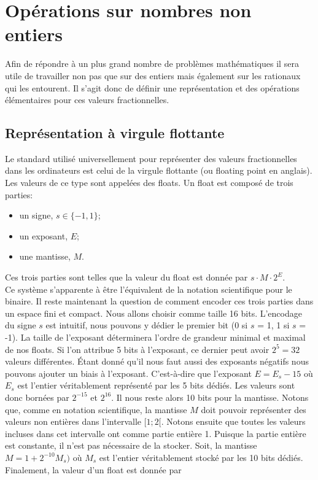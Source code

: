 \documentclass{article}
\begin{document}
\section{Opérations sur nombres non entiers}
Afin de répondre à un plus grand nombre de problèmes mathématiques il sera utile de travailler non pas que sur des entiers mais également sur les rationaux qui les entourent. Il s'agit donc de définir une représentation et des opérations élémentaires pour ces valeurs fractionnelles.
\subsection{Représentation à virgule flottante}
Le standard utilisé universellement pour représenter des valeurs fractionnelles dans les ordinateurs est celui de la virgule flottante (ou floating point en anglais). Les valeurs de ce type sont appelées des floats. Un float est composé de trois parties:
\begin{itemize}
    \item un signe, $s\in \{-1, 1\}$;
    \item un exposant, $E$;
    \item une mantisse, $M$.
\end{itemize}
Ces trois parties sont telles que la valeur du float est donnée par $s\cdot M\cdot 2^E$.\\
Ce système s'apparente à être l'équivalent de la notation scientifique pour le binaire.
Il reste maintenant la question de comment encoder ces trois parties dans un espace fini et compact. Nous allons choisir comme taille 16 bits. L'encodage du signe $s$ est intuitif, nous pouvons y dédier le premier bit (0 si $s$ = 1, 1 si $s$ = -1). La taille de l'exposant déterminera l'ordre de grandeur minimal et maximal de nos floats. Si l'on attribue 5 bits à l'exposant, ce dernier peut avoir $2^5 = 32$ valeurs différentes. Étant donné qu'il nous faut aussi des exposants négatifs nous pouvons ajouter un biais à l'exposant. C'est-à-dire que l'exposant $E = E_s - 15$ où $E_s$ est l'entier véritablement représenté par les 5 bits dédiés. Les valeurs sont donc bornées par $2^{-15}$ et $2^{16}$. Il nous reste alors 10 bits pour la mantisse.
Notons que, comme en notation scientifique, la mantisse $M$ doit pouvoir représenter des valeurs non entières dans l'intervalle $[1; 2[$. Notons ensuite que toutes les valeurs incluses dans cet intervalle ont comme partie entière 1. Puisque la partie entière est constante, il n'est pas nécessaire de la stocker. Soit, la mantisse $M = 1+2^{-10}M_s)$ où $M_s$ est l'entier véritablement stocké par les 10 bits dédiés. Finalement, la valeur d'un float est donnée par
\end{document}
